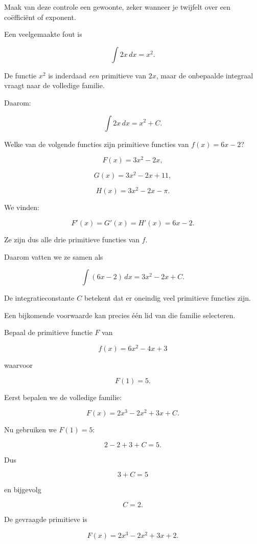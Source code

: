 \documentclass{ximera}
\begin{document}
\begin{opmerking}
Maak van deze controle een gewoonte, zeker wanneer je twijfelt over een
coëfficiënt of exponent.
\end{opmerking}



Een veelgemaakte fout is

\[
\int 2x\,dx=x^2.
\]

De functie \(x^2\) is inderdaad \emph{een} primitieve van \(2x\), maar
de onbepaalde integraal vraagt naar de volledige familie.

Daarom:

\[
\boxed{
\int2x\,dx=x^2+C.
}
\]

\begin{voorbeeld}
Welke van de volgende functies zijn primitieve functies van
\(f(x)=6x-2\)?

\[
F(x)=3x^2-2x,
\]

\[
G(x)=3x^2-2x+11,
\]

\[
H(x)=3x^2-2x-\pi.
\]

We vinden:

\[
F'(x)=G'(x)=H'(x)=6x-2.
\]

Ze zijn dus alle drie primitieve functies van \(f\).

Daarom vatten we ze samen als

\[
\int(6x-2)\,dx
=
3x^2-2x+C.
\]
\end{voorbeeld}



De integratieconstante \(C\) betekent dat er oneindig veel primitieve
functies zijn.

Een bijkomende voorwaarde kan precies één lid van die familie
selecteren.

\begin{voorbeeld}
Bepaal de primitieve functie \(F\) van

\[
f(x)=6x^2-4x+3
\]

waarvoor

\[
F(1)=5.
\]

Eerst bepalen we de volledige familie:

\[
F(x)
=
2x^3-2x^2+3x+C.
\]

Nu gebruiken we \(F(1)=5\):

\[
2-2+3+C=5.
\]

Dus

\[
3+C=5
\]

en bijgevolg

\[
C=2.
\]

De gevraagde primitieve is

\[
\boxed{
F(x)=2x^3-2x^2+3x+2.
}
\]
\end{voorbeeld}
\end{document}
